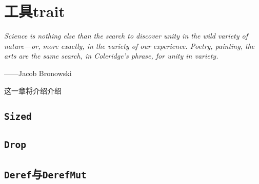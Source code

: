 \chapter{工具trait}\label{ch13}

\emph{Science is nothing else than the search to discover unity in the wild variety of nature—or, more exactly, in the variety of our experience. Poetry, painting, the arts are the same search, in Coleridge’s phrase, for unity in variety.}

\begin{flushright}
    ——Jacob Bronowski
\end{flushright}

这一章将介绍介绍

\section{\texttt{Sized}}\label{sized}

\section{\texttt{Drop}}\label{drop}

\section{\texttt{Deref}与\texttt{DerefMut}}\label{deref}
